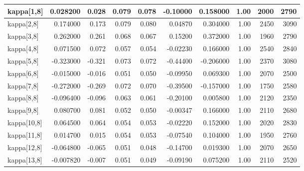 \documentclass[
]{article}
\begin{document}
\begin{longtable*}[t]{l|r|r|r|r|r|r|r|r|r}
\hline
kappa[1,8] & 0.028200 & 0.028 & 0.079 & 0.078 & -0.10000 & 0.158000 & 1.00 & 2000 & 2790\\
\hline
kappa[2,8] & 0.174000 & 0.173 & 0.079 & 0.080 & 0.04870 & 0.304000 & 1.00 & 2450 & 3090\\
\hline
kappa[3,8] & 0.262000 & 0.261 & 0.068 & 0.067 & 0.15200 & 0.372000 & 1.00 & 1960 & 2790\\
\hline
kappa[4,8] & 0.071500 & 0.072 & 0.057 & 0.054 & -0.02230 & 0.166000 & 1.00 & 2540 & 2840\\
\hline
kappa[5,8] & -0.323000 & -0.321 & 0.073 & 0.072 & -0.44400 & -0.206000 & 1.00 & 2370 & 3080\\
\hline
kappa[6,8] & -0.015000 & -0.016 & 0.051 & 0.050 & -0.09950 & 0.069300 & 1.00 & 2070 & 2500\\
\hline
kappa[7,8] & -0.272000 & -0.269 & 0.072 & 0.070 & -0.39500 & -0.157000 & 1.00 & 1750 & 2580\\
\hline
kappa[8,8] & -0.096400 & -0.096 & 0.063 & 0.061 & -0.20100 & 0.005800 & 1.00 & 2120 & 2350\\
\hline
kappa[9,8] & 0.080700 & 0.081 & 0.052 & 0.050 & -0.00347 & 0.166000 & 1.00 & 2110 & 2680\\
\hline
kappa[10,8] & 0.064500 & 0.064 & 0.054 & 0.053 & -0.02220 & 0.152000 & 1.00 & 2020 & 2830\\
\hline
kappa[11,8] & 0.014700 & 0.015 & 0.054 & 0.053 & -0.07540 & 0.104000 & 1.00 & 1950 & 2760\\
\hline
kappa[12,8] & -0.064800 & -0.065 & 0.051 & 0.048 & -0.14700 & 0.019300 & 1.00 & 2070 & 2650\\
\hline
kappa[13,8] & -0.007820 & -0.007 & 0.051 & 0.049 & -0.09190 & 0.075200 & 1.00 & 2110 & 2520\\
\hline
\end{longtable*}
\endgroup{}

\newpage{}

\begingroup\fontsize{7}{9}\selectfont
\end{document}
